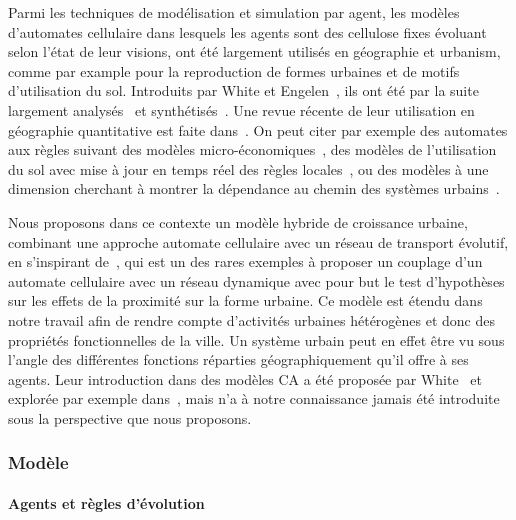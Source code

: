 \documentclass[french,12pt]{article}
\begin{document}
Parmi les techniques de modélisation et simulation par agent, les modèles d’automates cellulaire dans lesquels les agents sont des cellulose fixes évoluant selon l’état de leur visions, ont été largement utilisés en géographie et urbanism, comme par example pour la reproduction de formes urbaines et de motifs d’utilisation du sol. Introduits par White et Engelen~\cite{white1993cellular}, ils ont été par la suite largement analysés~\cite{batty1997cellular,batty1997possible} et synthétisés~\cite{Bat07}. Une revue récente de leur utilisation en géographie quantitative est faite dans~\cite{iltanen2012cellular}. On peut citer par exemple des automates aux règles suivant des modèles micro-économiques~\cite{DBM11}, des modèles de l’utilisation du sol avec mise à jour en temps réel des règles locales~\cite{Wu96alinguistic}, ou des modèles à une dimension cherchant à montrer la dépendance au chemin des systèmes urbains~\cite{peeters2009space}.

\bigskip

Nous proposons dans ce contexte un modèle hybride de croissance urbaine, combinant une approche automate cellulaire avec un réseau de transport évolutif, en s'inspirant de~\cite{MBB09,moreno2007conception}, qui est un des rares exemples à proposer un couplage d'un automate cellulaire avec un réseau dynamique avec pour but le test d'hypothèses sur les effets de la proximité sur la forme urbaine. Ce modèle est étendu dans notre travail afin de rendre compte d'activités urbaines hétérogènes et donc des propriétés fonctionnelles de la ville. Un système urbain peut en effet être vu sous l’angle des différentes fonctions réparties géographiquement qu’il offre à ses agents. Leur introduction dans des modèles CA a été proposée par White~\cite{white2006modeling} et explorée par exemple dans~\cite{van2012activity}, mais n’a à notre connaissance jamais été introduite sous la perspective que nous proposons.

\subsubsection{Modèle}

\paragraph{Agents et règles d’évolution}
\end{document}
